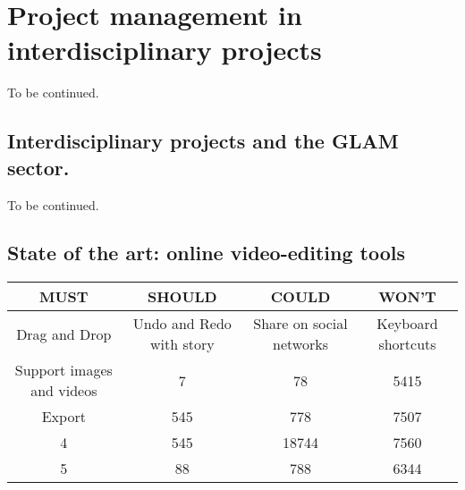 \chapter{Project management in interdisciplinary projects}
\label{ch:ch2_ProjectManagement}


To be continued. 

\section{Interdisciplinary projects and the GLAM sector.}
\label{sec:GLAM}

To be continued. 

\section{State of the art: online video-editing tools}
\label{sec:stateOfArt}

\begin{center}
 \begin{tabular}{||c c c c||} 
 \hline
 MUST & SHOULD & COULD & WON'T \\ [0.5ex] 
 \hline\hline
 Drag and Drop & Undo and Redo with story & Share on social networks & Keyboard shortcuts \\ 
 \hline
 Support images and videos & 7 & 78 & 5415 \\
 \hline
 Export & 545 & 778 & 7507 \\
 \hline
 4 & 545 & 18744 & 7560 \\
 \hline
 5 & 88 & 788 & 6344 \\ [1ex] 
 \hline
\end{tabular}
\end{center}